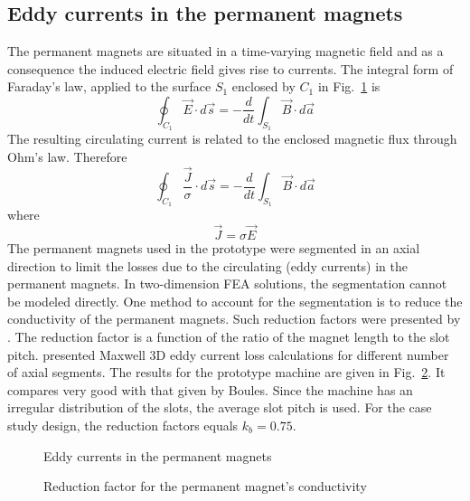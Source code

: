 \subsection{Eddy currents in the permanent magnets}
The permanent magnets are situated in a time-varying magnetic field and as a consequence the induced electric field gives rise to currents. The integral form of Faraday's law, applied to the surface $S_1$ enclosed by $C_1$ in Fig.~\ref{fig:f_pm_eddy} is
\begin{equation}
  \oint_{C_1}\vec{E}\cdot d\vec{s} = -\frac{d}{dt}\int_{S_1}\vec{B}\cdot d\vec{a}
\end{equation}
The resulting circulating current is related to the enclosed magnetic flux through Ohm's law. Therefore
\begin{equation}
  \oint_{C_1}\frac{\vec{J}}{\sigma}\cdot d\vec{s}=
  -\frac{d}{dt}\int_{S_1}\vec{B}\cdot d\vec{a}
\end{equation}
where
\begin{equation}
  \vec{J}= \sigma \vec{E}
\end{equation}
The permanent magnets used in the prototype were segmented in an axial direction to limit the losses due to the circulating (eddy currents) in the permanent magnets. In two-dimension FEA solutions, the segmentation cannot be modeled directly. One method to account for the segmentation is to reduce the conductivity of the permanent magnets. Such reduction factors were presented by \cite{Boules1980}. The reduction factor is a function of the ratio of the magnet length to the slot pitch. \cite{Stanton2008} presented Maxwell 3D eddy current loss calculations for different number of axial segments. The results for the prototype machine are given in Fig.~\ref{fig:f_boules}. It compares very good with that given by Boules. Since the machine has an irregular distribution of the slots, the average slot pitch is used. For the case study design, the reduction factors equals $k_b=0.75$. 
\begin{figure}[htbp]
	\centering
		
	\caption{Eddy currents in the permanent magnets}
	\label{fig:f_pm_eddy}
\end{figure}
\begin{figure}
	\centering
		
	\caption{Reduction factor for the permanent magnet's conductivity}
	\label{fig:f_boules}
\end{figure}

